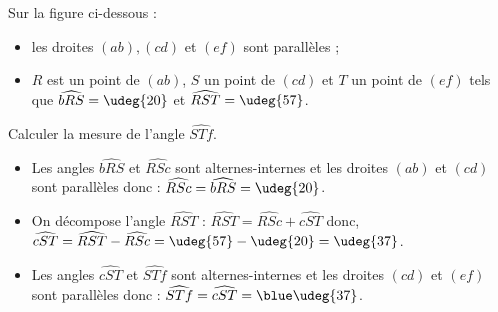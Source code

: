 \begin{exercice} %
    Sur la figure ci-dessous :
    \begin{itemize}
       \item les droites $(ab), (cd)$ et $(ef)$ sont parallèles ;
       \item $R$ est un point de $(ab)$, $S$ un point de $(cd)$ et $T$ un point de $(ef)$ tels que $\widehat{bRS} =\udeg{20}$ et $\widehat{RST} =\udeg{57}$.
    \end{itemize}
    Calculer la mesure de l'angle $\widehat{STf}$. \\
    \begin{center}    
   \end{center}


 \end{exercice}
 
 \begin{corrige}
    \begin{itemize}
       \item Les angles $\widehat{bRS}$ et $\widehat{RSc}$ sont alternes-internes et les droites $(ab)$ et $(cd)$ sont parallèles donc : $\widehat{RSc} =\widehat{bRS} =\udeg{20}$.
       \item On décompose l'angle $\widehat{RST}$ : $\widehat{RST} =\widehat{RSc}+\widehat{cST}$ donc, $\widehat{cST} =\widehat{RST} -\widehat{RSc} =\udeg{57}-\udeg{20} =\udeg{37}$.
       \item Les angles $\widehat{cST}$ et $\widehat{STf}$ sont alternes-internes et les droites $(cd)$ et $(ef)$ sont parallèles donc : $\widehat{STf} =\widehat{cST} =\blue \udeg{37}$.
    \end{itemize}
 \end{corrige}